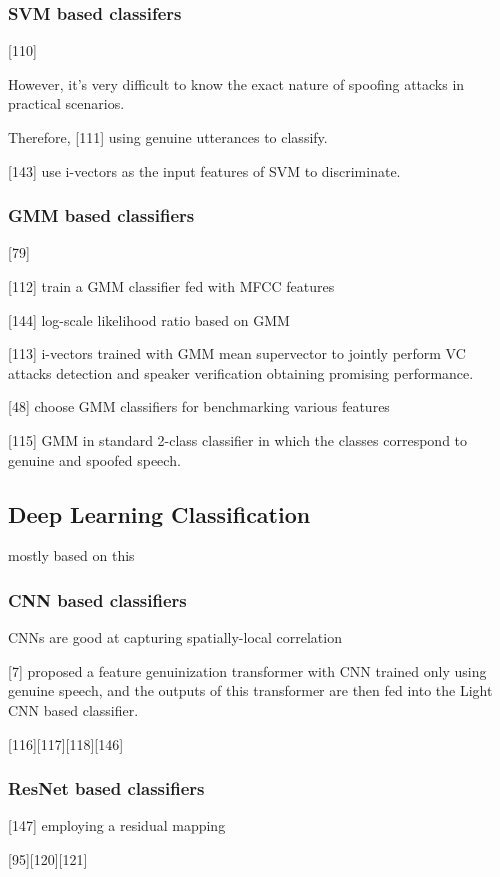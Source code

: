 \documentclass{article}
\begin{document}
\subsubsection{SVM based classifers}
[110]

However, it's very difficult to know the exact nature of spoofing attacks in practical scenarios. 

Therefore, [111] using genuine utterances to classify. 

[143] use i-vectors as the input features of SVM to discriminate. 

\subsubsection{GMM based classifiers}
[79]

[112] train a GMM classifier fed with MFCC features

[144] log-scale likelihood ratio based on GMM

[113] i-vectors trained with GMM mean supervector to jointly perform VC attacks detection and speaker verification obtaining promising performance. 

[48] choose GMM classifiers for benchmarking various features

[115] GMM in standard 2-class classifier in which the classes correspond to genuine and spoofed speech. 

\subsection{Deep Learning Classification}
mostly based on this

\subsubsection{CNN based classifiers}
CNNs are good at capturing spatially-local correlation

[7] proposed a feature genuinization transformer with CNN trained only using genuine speech, and the outputs of this transformer are then fed into the Light CNN based classifier. 

[116][117][118][146]

\subsubsection{ResNet based classifiers}
[147] employing a residual mapping

[95][120][121]
\end{document}
